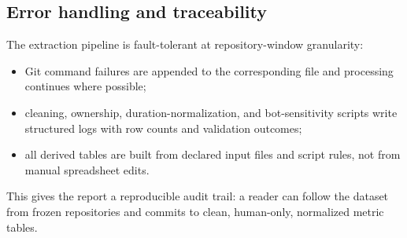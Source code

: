 \subsection{Error handling and traceability}
\label{sec:phase1_error_trace}

The extraction pipeline is fault-tolerant at repository-window granularity:
\begin{itemize}[leftmargin=*]
  \item Git command failures are appended to the corresponding  file and processing continues where possible;
  \item cleaning, ownership, duration-normalization, and bot-sensitivity scripts write structured logs with row counts and validation outcomes;
  \item all derived tables are built from declared input files and script rules, not from manual spreadsheet edits.
\end{itemize}

This gives the report a reproducible audit trail: a reader can follow the dataset from frozen repositories and commits to clean,
human-only, normalized metric tables.
